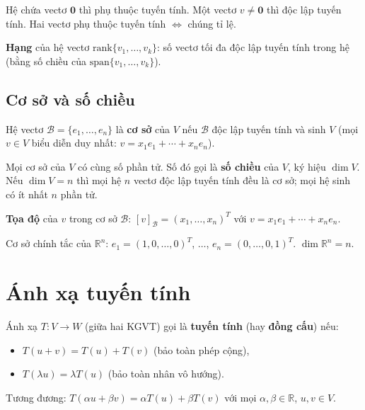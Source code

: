 \documentclass[12pt,a4paper]{article}
\begin{document}
\begin{tinhchat}
  Hệ chứa vectơ $\mathbf{0}$ thì phụ thuộc tuyến tính. Một vectơ $v \ne \mathbf{0}$ thì độc lập tuyến tính. Hai vectơ phụ thuộc tuyến tính $\Leftrightarrow$ chúng tỉ lệ.
\end{tinhchat}

\begin{dinhnghia}
  \textbf{Hạng} của hệ vectơ $\mathrm{rank}\{v_1, \ldots, v_k\}$: số vectơ tối đa độc lập tuyến tính trong hệ (bằng số chiều của $\mathrm{span}\{v_1, \ldots, v_k\}$).
\end{dinhnghia}

\subsection{Cơ sở và số chiều}

\begin{dinhnghia}
  Hệ vectơ $\mathcal{B} = \{e_1, \ldots, e_n\}$ là \textbf{cơ sở} của $V$ nếu $\mathcal{B}$ độc lập tuyến tính và sinh $V$ (mọi $v \in V$ biểu diễn duy nhất: $v = x_1 e_1 + \cdots + x_n e_n$).
\end{dinhnghia}

\begin{dinhly}
  Mọi cơ sở của $V$ có cùng số phần tử. Số đó gọi là \textbf{số chiều} của $V$, ký hiệu $\dim V$. Nếu $\dim V = n$ thì mọi hệ $n$ vectơ độc lập tuyến tính đều là cơ sở; mọi hệ sinh có ít nhất $n$ phần tử.
\end{dinhly}

\begin{dinhnghia}
  \textbf{Tọa độ} của $v$ trong cơ sở $\mathcal{B}$: $[v]_{\mathcal{B}} = (x_1, \ldots, x_n)^T$ với $v = x_1 e_1 + \cdots + x_n e_n$.
\end{dinhnghia}

\begin{vidu}
  Cơ sở chính tắc của $\mathbb{R}^n$: $e_1 = (1,0,\ldots,0)^T$, $\ldots$, $e_n = (0,\ldots,0,1)^T$. $\dim \mathbb{R}^n = n$.
\end{vidu}

\section{Ánh xạ tuyến tính}

\begin{dinhnghia}
  Ánh xạ $T: V \to W$ (giữa hai KGVT) gọi là \textbf{tuyến tính} (hay \textbf{đồng cấu}) nếu:
  \begin{itemize}
    \item $T(u + v) = T(u) + T(v)$ (bảo toàn phép cộng),
    \item $T(\lambda u) = \lambda T(u)$ (bảo toàn nhân vô hướng).
  \end{itemize}
  Tương đương: $T(\alpha u + \beta v) = \alpha T(u) + \beta T(v)$ với mọi $\alpha, \beta \in \mathbb{R}$, $u, v \in V$.
\end{dinhnghia}
\end{document}
